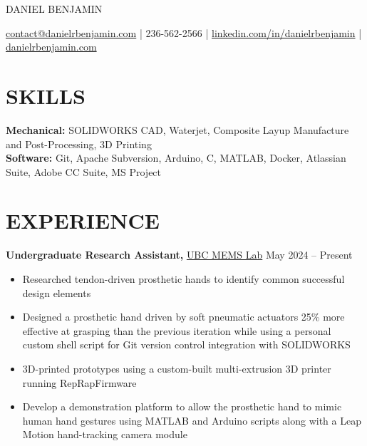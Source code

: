 \documentclass[11pt]{article}       %
\begin{document}
\centerline{\Huge \color{accentColour} DANIEL BENJAMIN}

\vspace{5pt}

\centerline{\href{mailto:contact@danielrbenjamin.com}{contact@danielrbenjamin.com} | 236-562-2566 | \href{https://www.linkedin.com/in/danielrbenjamin}{linkedin.com/in/danielrbenjamin} | \href{https://www.danielrbenjamin.com/}{danielrbenjamin.com}}

\vspace{-10pt}

\section*{SKILLS}
\textbf{Mechanical:} SOLIDWORKS CAD, Waterjet, Composite Layup Manufacture and Post-Processing, 3D Printing\\
\textbf{Software:} Git, Apache Subversion, Arduino, C, MATLAB, Docker, Atlassian Suite, Adobe CC Suite, MS Project

\vspace{-6.5pt}



\section*{EXPERIENCE}
\textbf{Undergraduate Research Assistant,} \href{https://icics.ubc.ca/research-to-innovation/icics-research-labs/}{UBC MEMS Lab} \hfill May 2024 -- Present \\
\vspace{-9pt}
\begin{itemize}
  \item Researched tendon-driven prosthetic hands to identify common successful design elements
  \item Designed a prosthetic hand driven by soft pneumatic actuators 25\% more effective at grasping than the previous iteration while using a personal custom shell script for Git version control integration with SOLIDWORKS
  \item 3D-printed prototypes using a custom-built multi-extrusion 3D printer running RepRapFirmware
  \item Develop a demonstration platform to allow the prosthetic hand to mimic human hand gestures using MATLAB and Arduino scripts along with a Leap Motion hand-tracking camera module
\end{itemize}
\end{document}
